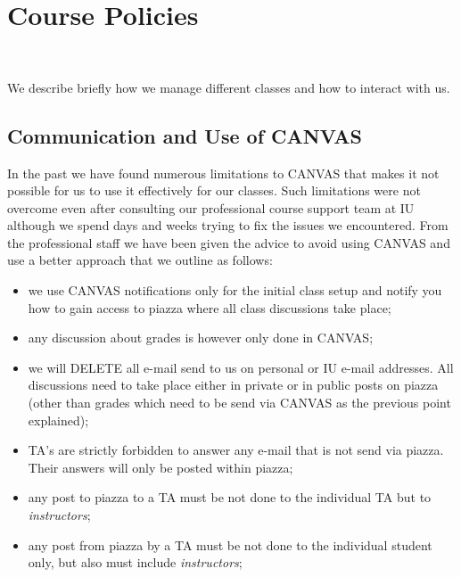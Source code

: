 
\chapter{Course Policies}\label{C:course-2018}

\FILENAME\

We describe briefly how we manage different classes and how to
interact with us. 

\section{Communication and Use of CANVAS}

In the past we have found numerous limitations to CANVAS that makes it
not possible for us to use it effectively for our classes. Such
limitations were not overcome even after consulting our professional
course support team at IU although we spend days and weeks trying to
fix the issues we encountered. From the professional staff we have
been given the advice to avoid using CANVAS and use a better approach
that we outline as follows:

\begin{itemize}

\item we use CANVAS notifications only for the initial class setup and
  notify you how to gain access to piazza where all class discussions
  take place;

\item any discussion about grades is however only done in CANVAS;

\item we will DELETE all e-mail send to us on personal or IU e-mail
  addresses. All discussions need to take place either in private or
  in public posts on piazza (other than grades which need to be send
  via CANVAS as the previous point explained);

\item TA's are strictly forbidden to answer any e-mail that is not send
  via piazza. Their answers will only be posted within piazza;

\item any post to piazza to a TA must be not done to the individual TA
  but to \textit{instructors};

\item any post from piazza by a TA must be not done to the individual
  student only, but also must include \textit{instructors};

\end{itemize}

